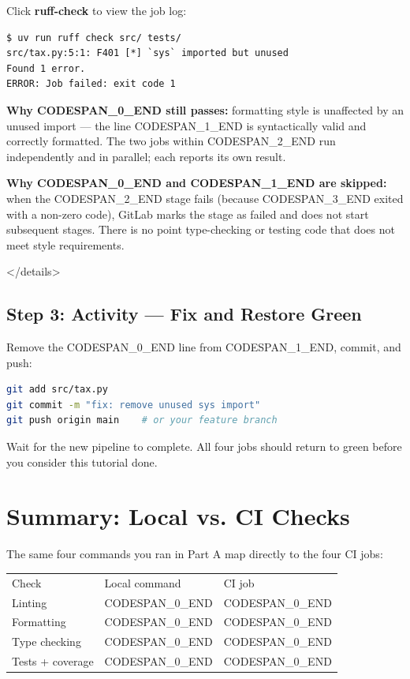 \documentclass[11pt,a4paper]{book}
\begin{document}
Click \textbf{ruff-check} to view the job log:

\begin{lstlisting}
$ uv run ruff check src/ tests/
src/tax.py:5:1: F401 [*] `sys` imported but unused
Found 1 error.
ERROR: Job failed: exit code 1
\end{lstlisting}

\textbf{Why CODESPAN\_0\_END still passes:} formatting style is unaffected by an unused import --- the line CODESPAN\_1\_END is syntactically valid and correctly formatted. The two jobs within CODESPAN\_2\_END run independently and in parallel; each reports its own result.

\textbf{Why CODESPAN\_0\_END and CODESPAN\_1\_END are skipped:} when the CODESPAN\_2\_END stage fails (because CODESPAN\_3\_END exited with a non-zero code), GitLab marks the stage as failed and does not start subsequent stages. There is no point type-checking or testing code that does not meet style requirements.

</details>

\medskip

\subsection{Step 3: Activity --- Fix and Restore Green}

Remove the CODESPAN\_0\_END line from CODESPAN\_1\_END, commit, and push:

\begin{lstlisting}[language=Bash]
git add src/tax.py
git commit -m "fix: remove unused sys import"
git push origin main    # or your feature branch
\end{lstlisting}

Wait for the new pipeline to complete. All four jobs should return to green before you consider this tutorial done.

\medskip

\section{Summary: Local vs. CI Checks}

The same four commands you ran in Part A map directly to the four CI jobs:

\begin{tabular}{lll}
\hline
Check & Local command & CI job \\
Linting & CODESPAN\_0\_END & CODESPAN\_0\_END \\
Formatting & CODESPAN\_0\_END & CODESPAN\_0\_END \\
Type checking & CODESPAN\_0\_END & CODESPAN\_0\_END \\
Tests + coverage & CODESPAN\_0\_END & CODESPAN\_0\_END \\
\hline
\end{tabular}
\end{document}
